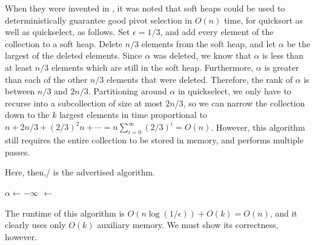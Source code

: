 \documentclass[11pt]{article}
\begin{document}
When they were invented in \cite{Ch00}, it was noted that soft heaps could be used to deterministically guarantee good pivot selection in $O(n)$ time, for quicksort as well as quickselect, as follows.  Set $\epsilon = 1/3$, and add every element of the collection to a soft heap.  Delete $n/3$ elements from the soft heap, and let $\alpha$ be the largest of the deleted elements.  Since $\alpha$ was deleted, we know that $\alpha$ is less than at least $n/3$ elements which are still in the soft heap.  Furthermore, $\alpha$ is greater than each of the other $n/3$ elements that were deleted.  Therefore, the rank of $\alpha$ is between $n/3$ and $2n/3$.  Partitioning around $\alpha$ in quickselect, we only have to recurse into a subcollection of size at most $2n/3$, so we can narrow the collection down to the $k$ largest elements in time proportional to $n + 2n/3 + (2/3)^2 n + \cdots = n \sum_{i=0}^\infty (2/3)^i = O(n)$.  However, this algorithm still requires the entire collection to be stored in memory, and performs multiple passes.

Here, then,/ is the advertised algorithm.

\begin{algorithm}[H]
$\alpha \leftarrow -\infty$\;
\Heap$\leftarrow$\;
\;
\end{algorithm}

The runtime of this algorithm is $O(n \log(1/\epsilon)) + O(k) = O(n)$, and it clearly uses only $O(k)$ auxiliary memory.  We must show its correctness, however.
\end{document}
